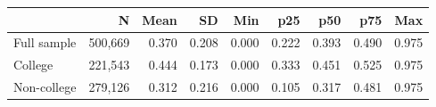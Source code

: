 \begin{tabular}{lrrrrrrrr}
\toprule
 & N & Mean & SD & Min & p25 & p50 & p75 & Max \\
\midrule
Full sample &      500,669 & 0.370 & 0.208 & 0.000 & 0.222 & 0.393 & 0.490 & 0.975 \\
College &      221,543 & 0.444 & 0.173 & 0.000 & 0.333 & 0.451 & 0.525 & 0.975 \\
Non-college &      279,126 & 0.312 & 0.216 & 0.000 & 0.105 & 0.317 & 0.481 & 0.975 \\
\bottomrule
\end{tabular}
